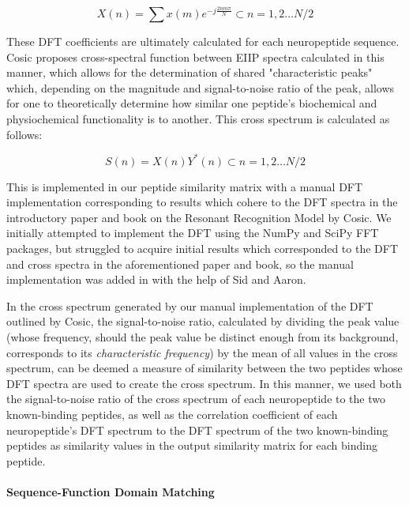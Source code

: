 \documentclass[]{article}
\let\oldparagraph\paragraph
\renewcommand{\paragraph}[1]{\oldparagraph{#1}\mbox{}}
\begin{document}
\begin{equation}
    X(n) = \sum x(m) e^{-j\frac{2nm\pi}{N}} \subset n = 1,2 \dots N/2
\end{equation}

These DFT coefficients are ultimately calculated for each neuropeptide sequence. Cosic proposes cross-spectral function between EIIP spectra calculated in this manner, which allows for the determination of shared "characteristic peaks" which, depending on the magnitude and signal-to-noise ratio of the peak, allows for one to theoretically determine how similar one peptide's biochemical and physiochemical functionality is to another. This cross spectrum is calculated as follows:

\begin{equation}
    S(n) = X(n)Y^*(n) \subset n = 1,2 \dots N/2
\end{equation}

This is implemented in our peptide similarity matrix with a manual DFT implementation corresponding to results which cohere to the DFT spectra in the introductory paper and book on the Resonant Recognition Model by Cosic. We initially attempted to implement the DFT using the NumPy and SciPy FFT packages, but struggled to acquire initial results which corresponded to the DFT and cross spectra in the aforementioned paper and book, so the manual implementation was added in with the help of Sid and Aaron.

In the cross spectrum generated by our manual implementation of the DFT outlined by Cosic, the signal-to-noise ratio, calculated by dividing the peak value (whose frequency, should the peak value be distinct enough from its background, corresponds to its \textit{characteristic frequency}) by the mean of all values in the cross spectrum, can be deemed a measure of similarity between the two peptides whose DFT spectra are used to create the cross spectrum. In this manner, we used both the signal-to-noise ratio of the cross spectrum of each neuropeptide to the two known-binding peptides, as well as the correlation coefficient of each neuropeptide's DFT spectrum to the DFT spectrum of the two known-binding peptides as similarity values in the output similarity matrix for each binding peptide.

\hypertarget{domainmatching}{%
\paragraph{Sequence-Function Domain Matching}\label{domainmatching}}
\end{document}

